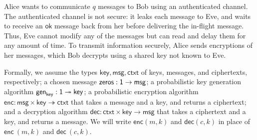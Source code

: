 \renewcommand{\key}{\mathsf{key}}
\renewcommand{\msg}{\mathsf{msg}}
\renewcommand{\ctxt}{\mathsf{ctxt}}
\renewcommand{\zeros}{\mathsf{zeros}}
\renewcommand{\gen}{\mathsf{gen}}
\renewcommand{\enc}{\mathsf{enc}}
\newcommand{\dec}{\mathsf{dec}}
\newcommand{\id}{\mathsf{id}}
\newcommand{\adv}{\mathsf{adv}}
\newcommand{\net}{\mathsf{net}}
\newcommand{\In}{\mathsf{In}}
\newcommand{\Out}{\mathsf{Out}}
\renewcommand{\Key}{\mathsf{Key}}
\newcommand{\Send}{\mathsf{Send}}
\newcommand{\Recv}{\mathsf{Recv}}
\renewcommand{\Enc}{\mathsf{Enc}}
\newcommand{\Dec}{\mathsf{Dec}}
\newcommand{\LeakMsgRcvd}{\mathsf{LeakMsgRcvd}}
\newcommand{\OkMsg}{\mathsf{OkMsg}}
\newcommand{\LeakCtxt}{\mathsf{LeakCtxt}}
\newcommand{\OkCtxt}{\mathsf{OkCtxt}}

Alice wants to communicate $q$ messages to Bob using an authenticated channel. The authenticated channel is not secure: it leaks each message to Eve, and waits to receive an $\mathsf{ok}$ message back from her before delivering the in-flight message. Thus, Eve cannot modify any of the messages but can read and delay them for any amount of time. To transmit information securely, Alice sends encryptions of her messages, which Bob decrypts using a shared key not known to Eve.

Formally, we assume the types $\key, \msg, \ctxt$ of keys, messages, and ciphertexts, respectively; a chosen message $\zeros : \one \rightarrow \msg$; a probabilistic key generation algorithm $\gen_\key : \one \twoheadrightarrow \key$; a probabilistic encryption algorithm $\enc : \msg \times \key \twoheadrightarrow \ctxt$ that takes a message and a key, and returns a ciphertext; and a decryption algorithm $\dec : \ctxt \times \key \rightarrow \msg$
that takes a ciphertext and a key, and returns a message. We will write $\enc(m,k)$ and $\dec(c,k)$ in place of $\enc \ (m,k)$ and $\dec \ (c,k)$.

